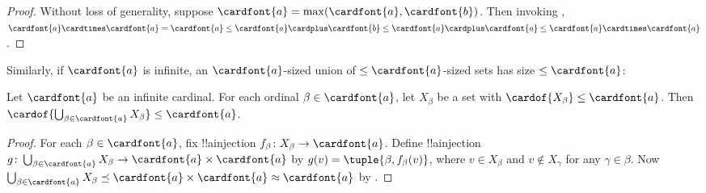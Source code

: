 \documentclass[../../../include/open-logic-section]{subfiles}
\begin{document}
\begin{proof}
	Without loss of generality, suppose $\cardfont{a} = \max(\cardfont{a}, \cardfont{b})$. Then invoking , $\cardfont{a}\cardtimes\cardfont{a} = \cardfont{a} \leq \cardfont{a} \cardplus \cardfont{b} \leq \cardfont{a} \cardplus \cardfont{a} \leq \cardfont{a} \cardtimes \cardfont{a}$.
\end{proof}\noindent
Similarly, if $\cardfont{a}$ is infinite, an $\cardfont{a}$-sized union of $\leq\cardfont{a}$-sized sets has size $\leq\cardfont{a}$:
\begin{prop}
	Let $\cardfont{a}$ be an infinite cardinal. For each ordinal $\beta \in \cardfont{a}$, let $X_\beta$ be a set with $\cardof{X_\beta} \leq \cardfont{a}$. Then $\cardof{\bigcup_{\beta \in \cardfont{a}} X_\beta} \leq \cardfont{a}$.
\end{prop}
\begin{proof}
	For each $\beta \in \cardfont{a}$, fix !!a{injection} $f_\beta \colon X_\beta \to \cardfont{a}$. Define !!a{injection} $g \colon \bigcup_{\beta \in \cardfont{a}} X_\beta \to \cardfont{a} \times \cardfont{a}$ by $g(v) = \tuple{\beta, f_\beta(v)}$, where $v \in X_\beta$ and $v \notin X_\gamma$ for any $\gamma \in \beta$. Now $\bigcup_{\beta \in \cardfont{a}} X_\beta \preceq \cardfont{a} \times \cardfont{a} \approx \cardfont{a}$ by .
\end{proof}
\end{document}
